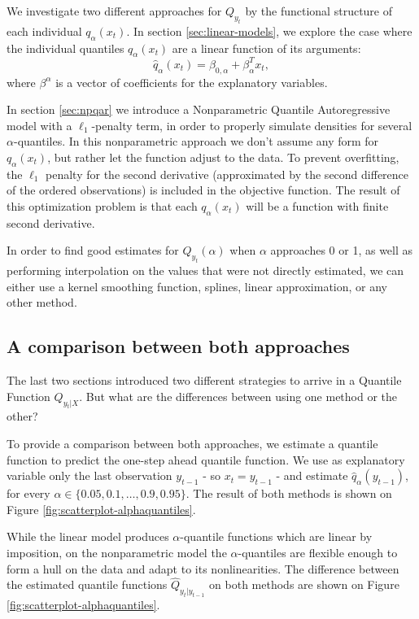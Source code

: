 We investigate two different approaches for $Q_{y_t}$ by the functional structure of each individual $q_\alpha(x_t)$.
In section \ref{sec:linear-models}, we explore the case where the individual quantiles $q_\alpha(x_t)$ are a linear function of its arguments:
\begin{equation}
\hat{q}_\alpha(x_t) = \beta_{0,\alpha} +   \beta_\alpha^T x_t,
\label{eq:fun-quantile}
\end{equation}
where $\beta^\alpha$ is a vector of coefficients for the explanatory variables.

In section \ref{sec:npqar} we introduce a Nonparametric Quantile Autoregressive model with a $\ell_{1}$-penalty term, in order to properly simulate densities for several $\alpha$-quantiles. In this nonparametric approach we don't assume any form for $q_\alpha(x_t)$, but rather let the function adjust to the data. To prevent overfitting, the $\ell_1$ penalty for the second derivative (approximated by the second difference of the ordered observations) is included in the objective function. The result of this optimization problem is that each $q_\alpha(x_t)$ will be a function with finite second derivative.

In order to find good estimates for $Q_{y_{t}}(\alpha)$ when $\alpha$ approaches 0 or 1, as well as performing interpolation on the values that were not directly estimated, we can either use a kernel smoothing function, splines, linear approximation, or any other method. 






\subsection{A comparison between both approaches}

The last two sections introduced two different strategies to arrive in a Quantile Function $Q_{y_t|X}$. But what are the differences between using one method or the other? 

To provide a comparison between both approaches, we estimate a quantile function to predict the one-step ahead quantile function. We use as explanatory variable only the last observation $y_{t-1}$ - so $x_t = y_{t-1}$ - and estimate $\hat{q}_\alpha(y_{t-1})$, for every $\alpha \in \{0.05, 0.1, \dots, 0.9, 0.95 \}$. The result of both methods is shown on Figure \ref{fig:scatterplot-alphaquantiles}.

While the linear model produces $\alpha$-quantile functions which are linear by imposition, on the nonparametric model the $\alpha$-quantiles are flexible enough to form a hull on the data and adapt to its nonlinearities. The difference between the estimated quantile functions $\hat{Q}_{y_t|y_{t-1}}$ on both methods are shown on Figure \ref{fig:scatterplot-alphaquantiles}.

